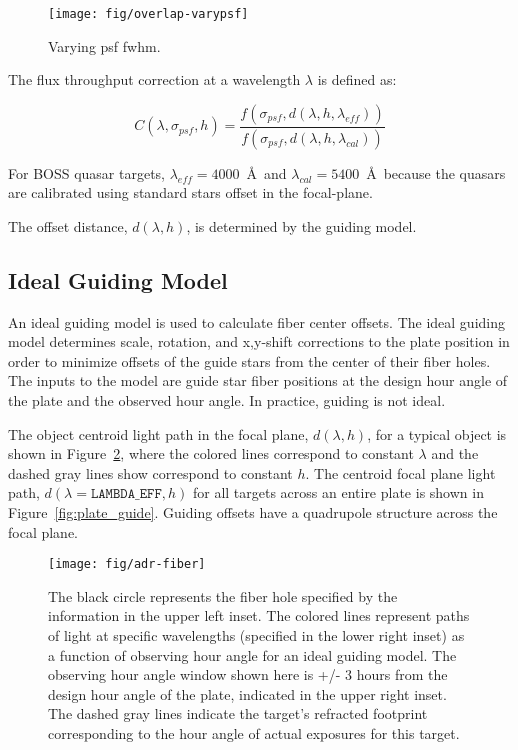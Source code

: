 \documentclass{emulateapj}
\providecommand{\fig}[1]{Figure~\ref{fig:#1}}
\begin{document}
\begin{figure}
\centering
\texttt{[image: fig/overlap-varypsf]}
\caption{Varying psf fwhm.}
\label{fig:overlap-psf}
\end{figure}

The flux throughput correction at a wavelength $\lambda$ is defined as:

\begin{equation}
\label{}
C(\lambda,\sigma_{psf},h) = \frac{f(\sigma_{psf},d(\lambda,h,\lambda_{eff}))}{f(\sigma_{psf},d(\lambda,h,\lambda_{cal}))}
\end{equation}

For BOSS quasar targets, $\lambda_{eff} = 4000$~\AA~and $\lambda_{cal} = 5400$~\AA~because the quasars are calibrated using standard stars offset in the focal-plane. 

The offset distance, $d(\lambda,h)$, is determined by the guiding model.

\subsection{Ideal Guiding Model}

An ideal guiding model is used to calculate fiber center offsets. The ideal guiding model determines scale, rotation, and x,y-shift corrections to the plate position in order to minimize offsets of the guide stars from the center of their fiber holes. The inputs to the model are guide star fiber positions at the design hour angle of the plate and the observed hour angle. In practice, guiding is not ideal.

The object centroid light path in the focal plane, $d(\lambda,h)$, for a typical object is shown in \fig{fiber_hole}, where the colored lines correspond to constant $\lambda$ and the dashed gray lines show correspond to constant $h$. The centroid focal plane light path, $d(\lambda=\texttt{LAMBDA\_EFF},h)$ for all targets across an entire plate is shown in \fig{plate_guide}. Guiding offsets have a quadrupole structure across the focal plane.

\begin{figure}
\centering
\texttt{[image: fig/adr-fiber]}
\caption{The black circle represents the fiber hole specified by the information in the upper left inset. The colored lines represent paths of light at specific wavelengths (specified in the lower right inset) as a function of observing hour angle for an ideal guiding model. The observing hour angle window shown here is +/- 3 hours from the design hour angle of the plate, indicated in the upper right inset. The dashed gray lines indicate the target's refracted footprint corresponding to the hour angle of actual exposures for this target.}
\label{fig:fiber_hole}
\end{figure}
\end{document}
